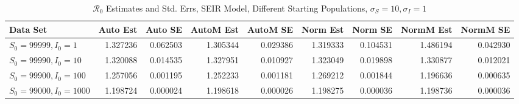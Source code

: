 \documentclass[12pt]{article}
\newcommand{\rr}{\ensuremath{\mathcal{R}_0}}
\begin{document}
\begin{table}[H]
	
	\caption{$\rr$ Estimates and Std. Errs, SEIR Model,
		Different Starting Populations, 
		$\sigma_S = 10, \sigma_I = 1$}
	\begin{footnotesize}
		\hskip -1.7cm
	\begin{tabular}{l|r|r|r|r|r|r|r|r}
		\hline
		Data Set & Auto Est & Auto SE & AutoM Est & AutoM SE & Norm Est & Norm SE & NormM Est & NormM SE\\
		\hline
		$S_0 = 99999, I_0 = 1$ & 1.327236 & 0.062503 & 1.305344 & 0.029386 & 1.319333 & 0.104531 & 1.486194 & 0.042930\\
		\hline
		$S_0 = 99990, I_0 = 10$ & 1.320088 & 0.014535 & 1.327951 & 0.010927 & 1.323049 & 0.019898 & 1.330877 & 0.012021\\
		\hline
		$S_0 = 99900, I_0 = 100$ & 1.257056 & 0.001195 & 1.252233 & 0.001181 & 1.269212 & 0.001844 & 1.196636 & 0.000635\\
		\hline
		$S_0 = 99000, I_0 = 1000$ & 1.198724 & 0.000024 & 1.198618 & 0.000026 & 1.198275 & 0.000036 & 1.198736 & 0.000036\\
		\hline
	\end{tabular}
\end{footnotesize}
\end{table}
\end{document}
